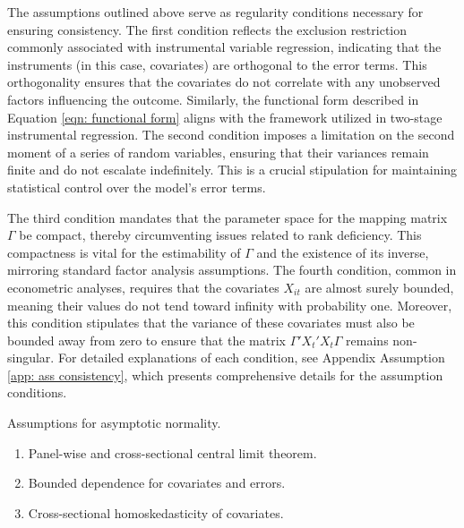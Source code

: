 \documentclass[12pt]{article}
\begin{document}
The assumptions outlined above serve as regularity conditions necessary for ensuring consistency. The first condition reflects the exclusion restriction commonly associated with instrumental variable regression, indicating that the instruments (in this case, covariates) are orthogonal to the error terms. This orthogonality ensures that the covariates do not correlate with any unobserved factors influencing the outcome. Similarly, the functional form described in Equation \ref{eqn: functional form} aligns with the framework utilized in two-stage instrumental regression. The second condition imposes a limitation on the second moment of a series of random variables, ensuring that their variances remain finite and do not escalate indefinitely. This is a crucial stipulation for maintaining statistical control over the model's error terms. 

The third condition mandates that the parameter space for the mapping matrix $\Gamma$ be compact, thereby circumventing issues related to rank deficiency. This compactness is vital for the estimability of $\Gamma$ and the existence of its inverse, mirroring standard factor analysis assumptions. The fourth condition, common in econometric analyses, requires that the covariates $X_{it}$ are almost surely bounded, meaning their values do not tend toward infinity with probability one. Moreover, this condition stipulates that the variance of these covariates must also be bounded away from zero to ensure that the matrix $\Gamma'X_t'X_t\Gamma$ remains non-singular. For detailed explanations of each condition, see Appendix Assumption \ref{app: ass consistency}, which presents comprehensive details for the assumption conditions.

\begin{assumption}
Assumptions for asymptotic normality.
\label{ass: asy normal}
\begin{enumerate}
    \item Panel-wise and cross-sectional central limit theorem.
    \item Bounded dependence for covariates and errors.
    \item Cross-sectional homoskedasticity of covariates.
\end{enumerate}
\end{assumption}
\end{document}
